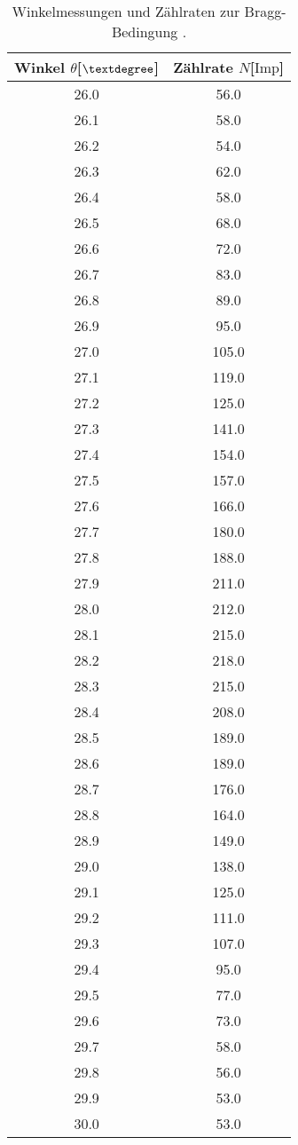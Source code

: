 \begin{table}
\centering
\caption{Winkelmessungen und Zählraten zur Bragg-Bedingung \cite{hinweis}.}
\label{tab:ogemessdaten1}
\begin{tabular}{c c}
    \toprule
    Winkel $\theta$[$\textdegree$] & Zählrate $N$[$\text{Imp}$]\\
    \midrule
    26.0    &	56.0\\
    26.1    &	58.0\\
    26.2    &	54.0\\
    26.3    &	62.0\\
    26.4    &	58.0\\
    26.5    &	68.0\\
    26.6    &	72.0\\
    26.7    &	83.0\\
    26.8    &	89.0\\
    26.9    &	95.0\\
    27.0    &	105.0\\
    27.1    &	119.0\\
    27.2    &	125.0\\
    27.3    &	141.0\\
    27.4    &	154.0\\
    27.5    &	157.0\\
    27.6    &	166.0\\
    27.7    &	180.0\\
    27.8    &	188.0\\
    27.9    &	211.0\\
    28.0    &	212.0\\
    28.1    &	215.0\\
    28.2    &	218.0\\
    28.3    &	215.0\\
    28.4    &	208.0\\
    28.5    &	189.0\\
    28.6    &	189.0\\
    28.7    &	176.0\\
    28.8    &	164.0\\
    28.9    &	149.0\\
    29.0    &	138.0\\
    29.1    &	125.0\\
    29.2    &	111.0\\
    29.3    &	107.0\\
    29.4    &	95.0\\
    29.5    &	77.0\\
    29.6    &	73.0\\
    29.7    &	58.0\\
    29.8    &	56.0\\
    29.9    &	53.0\\
    30.0    &	53.0\\
    \bottomrule
\end{tabular}
\end{table}
